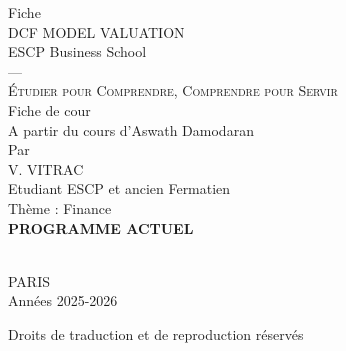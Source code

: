 
\begin{center}
\vspace*{2cm}

{\TitleFont\LARGE Fiche}\\[1em]
{\TitleFont\Huge DCF MODEL VALUATION}\\[1em]
{\TitleFont\large ESCP Business School}\\[2em]

\textsc{---}\\[1em]
\textsc{Étudier pour Comprendre, Comprendre pour Servir}\\[2em]

{\SmallCapsFont Fiche de cour}\\[0.5em]
{\small A partir du cours d'Aswath Damodaran}\\[2em]

{\SmallCapsFont Par}\\[0.5em]
{\Large V. VITRAC}\\
{\footnotesize Etudiant ESCP et ancien Fermatien}\\[2em]

{\normalsize Thème : Finance}\\[2em]

{\Large\textbf{PROGRAMME ACTUEL}}\\[2em]

\\[2em]

{\Large PARIS}\\[0.5em]
{\small Années 2025-2026} 

\vspace{5mm}

{\scriptsize Droits de traduction et de reproduction réservés}
\end{center}
